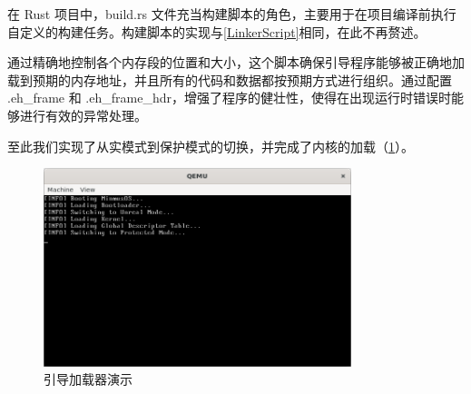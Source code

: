 在 Rust 项目中，build.rs 文件充当构建脚本的角色，主要用于在项目编译前执行自定义的构建任务。构建脚本的实现与\cref{LinkerScript}相同，在此不再赘述。

通过精确地控制各个内存段的位置和大小，这个脚本确保引导程序能够被正确地加载到预期的内存地址，并且所有的代码和数据都按预期方式进行组织。通过配置 .eh\_frame 和 .eh\_frame\_hdr，增强了程序的健壮性，使得在出现运行时错误时能够进行有效的异常处理。

至此我们实现了从实模式到保护模式的切换，并完成了内核的加载（\cref{fig:BootloaderPresentation}）。

\begin{figure}[htbp]
    \centering
    \includegraphics[width=0.8\textwidth]{figures/BootloaderPresentation.png}
    \caption{引导加载器演示}
    \label{fig:BootloaderPresentation}
\end{figure}